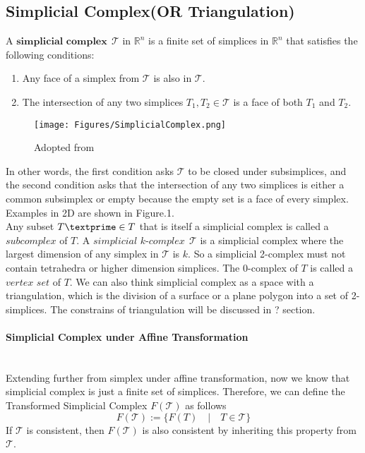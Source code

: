 \subsection{Simplicial Complex(OR Triangulation)}
    \begin{definition*}
    A $\textbf{simplicial complex} ~~\mathcal T$ in $\mathbb{R}^n$ is a finite set of simplices in $\mathbb{R}^n$ that satisfies the following conditions:
    \begin{enumerate}[label =\arabic*.]
      \item Any face of a simplex from $\mathcal{T}$ is also in $\mathcal{T}$.
      \item The intersection of any two simplices ${T}_1, {T}_2 \in \mathcal{T}$ is a face of both ${T}_1$ and  ${T}_2$.
    \end{enumerate}
    \begin{figure}[b]
    \centering
    \texttt{[image: Figures/SimplicialComplex.png]}
    \caption[Simplicial Complex Example and Counterexample]{Adopted from~\cite{WEBSITE:1}}%
    \label{Fig2}
    \end{figure}
    \end{definition*}
    In other words, the first condition asks $\mathcal{T}$ to be closed under subsimplices, and the second condition asks that the intersection of any two simplices is either a common subsimplex or empty because the empty set is a face of every simplex. Examples in 2D are shown in Figure.1. \\
    \indent
    Any subset ${T\textprime}\in{T}$ that is itself a simplicial complex is called a $\textit{subcomplex}$ of ${T}$. A $\textit{simplicial k-complex} ~~\mathcal T$ is a simplicial complex where the largest dimension of any simplex in $\mathcal T$ is ${k}$. So a simplicial 2-complex must not contain tetrahedra or higher dimension simplices. The 0-complex of ${T}$ is called a $\textit{vertex set}$ of ${T}$. We can also think simplicial complex as a space with a triangulation, which is the division of a surface or a plane polygon into a set of 2-simplices. The constrains of triangulation will be discussed in ? section.\\

    \paragraph{Simplicial Complex under Affine Transformation}\mbox{}\\
    Extending further from simplex under affine transformation, now we know that simplicial complex is just a finite set of simplices. Therefore, we can define the Transformed Simplicial Complex $F(\mathcal{T})$ as follows
    \begin{equation*}
    F(\mathcal{T}) := \{F(T) \quad \vert \quad T\in \mathcal{T}\}
    \end{equation*}
    If $\mathcal{T}$ is consistent, then $F(\mathcal{T})$ is also consistent by inheriting this property from $\mathcal{T}$.

